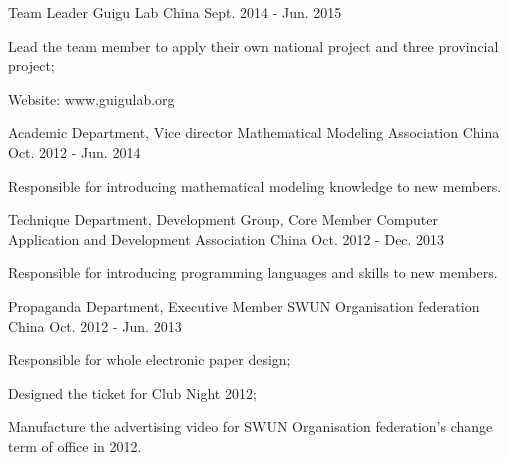 \begin{cventries}
  \cventry
    {Team Leader}
    {Guigu Lab}
    {China}
    {Sept. 2014 - Jun. 2015}
    {
      \begin{cvitems}
        \item {Lead the team member to apply their own national project and three provincial project;}
        \item {Website: www.guigulab.org}
      \end{cvitems}
    }
  \cventry
    {Academic Department, Vice director}
    {Mathematical Modeling Association}
    {China}
    {Oct. 2012 - Jun. 2014}
    {
      \begin{cvitems}
        \item {Responsible for introducing mathematical modeling knowledge to new members.}
      \end{cvitems}
    }
  \cventry
    {Technique Department, Development Group, Core Member}
    {Computer Application and Development Association}
    {China}
    {Oct. 2012 - Dec. 2013}
    {
      \begin{cvitems}
        \item {Responsible for introducing programming languages and skills to new members.}
      \end{cvitems}
    }
  \cventry
    {Propaganda Department, Executive Member}
    {SWUN Organisation federation}
    {China}
    {Oct. 2012 - Jun. 2013}
    {
      \begin{cvitems}
        \item {Responsible for whole electronic paper design;}
        \item {Designed the ticket for Club Night 2012;}
        \item {Manufacture the advertising video for SWUN Organisation federation’s change term of office in 2012.}
      \end{cvitems}
    }
\end{cventries}
